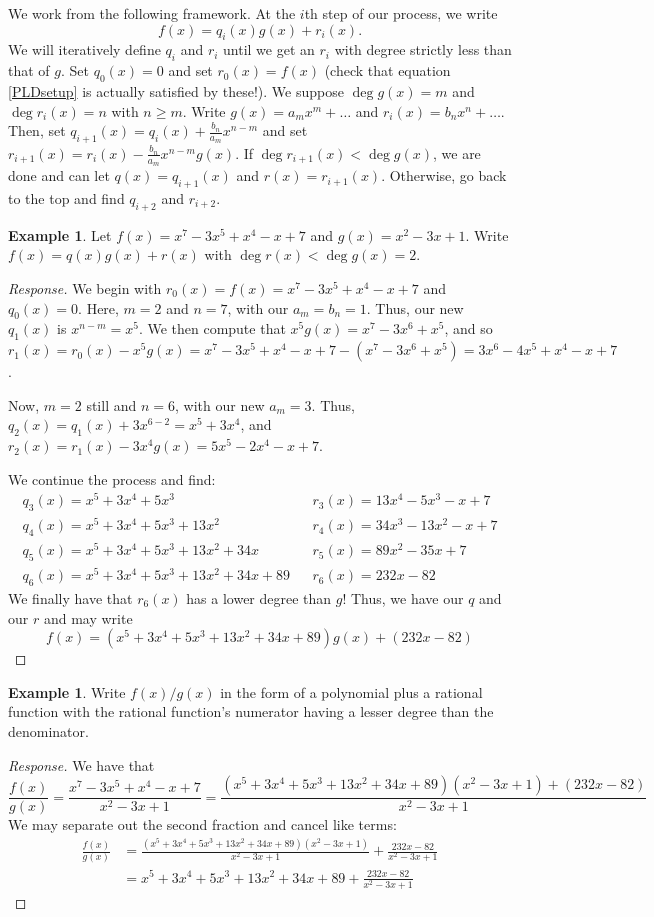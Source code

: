 \documentclass[english]{book}
\theoremstyle{remark}
\theoremstyle{definition}
\newtheorem{exle}[theorem]{Example}
\newtheorem*{next week}{Next Week}
\begin{document}
We work from the following framework. At the $i$th step of our process, we write
\begin{equation}f(x)=q_i(x)g(x)+r_i(x).\label{PLDsetup}\end{equation}
We will iteratively define $q_i$ and $r_i$ until we get an $r_i$ with degree strictly less than that of $g$. Set $q_0(x)=0$ and set $r_0(x)=f(x)$ (check that equation \eqref{PLDsetup} is actually satisfied by these!). We suppose $\deg g(x)=m$ and $\deg r_i(x)=n$ with $n\geq m$. Write $g(x)=a_mx^m+\dots$ and $r_i(x)=b_nx^n+\dots$. Then, set $q_{i+1}(x)=q_{i}(x)+\frac{b_n}{a_m}x^{n-m}$ and set $r_{i+1}(x)=r_i(x)-\frac{b_n}{a_m}x^{n-m}g(x)$. If $\deg r_{i+1}(x)<\deg g(x)$, we are done and can let $q(x)=q_{i+1}(x)$ and $r(x)=r_{i+1}(x)$. Otherwise, go back to the top and find $q_{i+2}$ and $r_{i+2}$.
\begin{exle}
Let $f(x)=x^7-3x^5+x^4-x+7$ and $g(x)=x^2-3x+1$. Write $f(x)=q(x)g(x)+r(x)$ with $\deg r(x)<\deg g(x)=2$. 
\end{exle}\begin{proof}[Response]
We begin with $r_0(x)=f(x)=x^7-3x^5+x^4-x+7$ and $q_0(x)=0$. Here, $m=2$ and $n=7$, with our $a_m=b_n=1$. Thus, our new $q_1(x)$ is $x^{n-m}=x^5$. We then compute that $x^5g(x)=x^7-3x^6+x^5$, and so $r_1(x)=r_0(x)-x^5g(x)=x^7-3x^5+x^4-x+7-(x^7-3x^6+x^5)=3x^6-4x^5+x^4-x+7$.

Now, $m=2$ still and $n=6$, with our new $a_m=3$. Thus, $q_2(x)=q_1(x)+3x^{6-2}=x^5+3x^4$, and $r_2(x)=r_1(x)-3x^4g(x)=5x^5-2x^4-x+7$.


We continue the process and find:
\begin{align*}
	q_3(x)=x^5+3x^4+5x^3&&r_3(x)=13 x^4- 5 x^3 -x+7\\
	q_4(x)=x^5+3x^4+5x^3+13x^2&&r_4(x)=34 x^3-13 x^2-x+7\\
	q_5(x)=x^5+3x^4+5x^3+13x^2+34x&&r_5(x)=89x^2-35x+7\\
	q_6(x)=x^5+3x^4+5x^3+13x^2+34x+89&&r_6(x)=232x-82
\end{align*}
We finally have that $r_6(x)$ has a lower degree than $g$! Thus, we have our $q$ and our $r$ and may write
$$f(x)=(x^5+3x^4+5x^3+13x^2+34x+89)g(x)+(232x-82)$$\end{proof}
\begin{exle}
	Write $f(x)/g(x)$ in the form of a polynomial plus a rational function with the rational function's numerator having a lesser degree than the denominator.
\end{exle}
\begin{proof}[Response]
	We have that $$\frac{f(x)}{g(x)}=\frac{x^7-3x^5+x^4-x+7}{x^2-3x+1}=\frac{(x^5+3x^4+5x^3+13x^2+34x+89)(x^2-3x+1)+(232x-82)}{x^2-3x+1}$$
	We may separate out the second fraction and cancel like terms:
\begin{align*}\frac{f(x)}{g(x)}&=	\frac{(x^5+3x^4+5x^3+13x^2+34x+89)(x^2-3x+1)}{x^2-3x+1}+\frac{232x-82}{x^2-3x+1}\\&=x^5+3x^4+5x^3+13x^2+34x+89+\frac{232x-82}{x^2-3x+1}\end{align*}
\end{proof}
\end{document}
